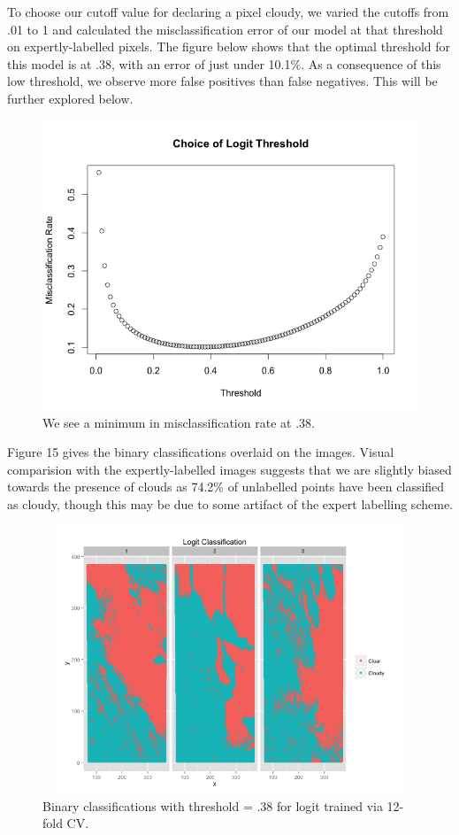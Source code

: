 \documentclass{article}\usepackage[]{graphicx}\usepackage[]{color}
\begin{document}
To choose our cutoff value for declaring a pixel cloudy, we varied the cutoffs from .01 to 1 and calculated the misclassification error of our model at that threshold on expertly-labelled pixels. The figure below shows that the optimal threshold for this model is at .38, with an error of just under 10.1$\%$. As a consequence of this low threshold, we observe more false positives than false negatives. This will be further explored below.

\begin{figure}[H]
\begin{center}
\includegraphics[scale = .35]{threshold.png}
\caption{We see a minimum in misclassification rate at .38.}
\end{center}
\end{figure}

Figure 15 gives the binary classifications overlaid on the images. Visual comparision with the expertly-labelled images suggests that we are slightly biased towards the presence of clouds as 74.2$\%$ of unlabelled points have been classified as cloudy, though this may be due to some artifact of the expert labelling scheme.
\begin{figure}[H]
\includegraphics[width = 18cm, height = 8cm]{LogitClassification.png}
\caption{Binary classifications with threshold = .38 for logit trained via 12-fold CV.}
\end{figure}
\end{document}
